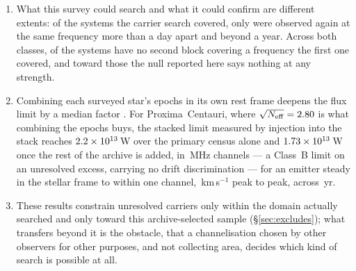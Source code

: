 \begin{enumerate}[leftmargin=1.6em,itemsep=4pt,topsep=4pt,parsep=0pt]
\item What this survey could search and what it could confirm are different
extents: of the \RcSearchSys{} systems the carrier search covered, only
\RcConfSysDay{} were observed again at the same frequency more than a day
apart and \RcConfSysYr{} beyond a year. Across both classes,
\RcNoRepSysAll{} of the \RcSearchSysAll{} systems have no second block
covering a frequency the first one covered, and toward those the null
reported here says nothing at any strength.

\item Combining each surveyed star's epochs in its own rest frame deepens
the flux limit by a median factor \SyStkGainMed. For Proxima~Centauri,
where $\sqrt{N_{\rm eff}}=2.80$ is what combining the epochs
buys, the stacked limit measured by injection into the stack reaches
$2.2\times10^{13}$\,W over the primary census alone and
$1.73\times10^{13}$\,W once the rest of the archive is added, in
\ChanBModeMHz\,MHz channels --- a Class~B limit on an unresolved excess,
carrying no drift discrimination --- for an emitter steady in the stellar
frame to within one channel, \StkProxTolKms\,km\,s$^{-1}$ peak to peak,
across \StkProxSpanYr\,yr.

\item These results constrain unresolved carriers only within the domain
actually searched and only toward this archive-selected sample
(\S\ref{sec:excludes}); what transfers beyond it is the obstacle, that a
channelisation chosen by other observers for other purposes, and not
collecting area, decides which kind of search is possible at all.

\end{enumerate}

